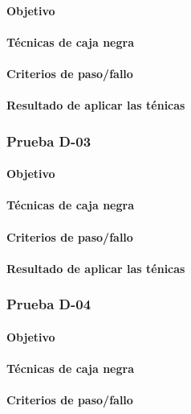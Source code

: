 \documentclass[10pt,a4paper]{article}
\begin{document}
			\paragraph{Objetivo}
			\paragraph{Técnicas de caja negra}
			\paragraph{Criterios de paso/fallo}
			\paragraph{Resultado de aplicar las ténicas}
			\subsubsection{Prueba D-03}
			\paragraph{Objetivo}
			\paragraph{Técnicas de caja negra}
			\paragraph{Criterios de paso/fallo}
			\paragraph{Resultado de aplicar las ténicas}
			\subsubsection{Prueba D-04}
			\paragraph{Objetivo}
			\paragraph{Técnicas de caja negra}
			\paragraph{Criterios de paso/fallo}
\end{document}
